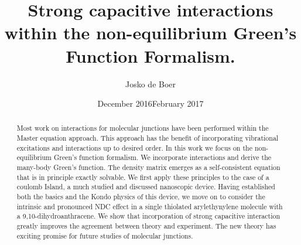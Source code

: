 \documentclass{article}
\title{Strong capacitive interactions within the non-equilibrium Green's Function Formalism.}
\author{Josko de Boer}
\date{December 2016}
\date{February 2017}
\begin{document}
\maketitle
\begin{abstract}
    Most work on interactions for molecular junctions have been performed within the Master equation approach. This approach has the benefit of incorporating vibrational excitations and interactions up to desired order. In this work we focus on the non-equilibrium Green's function formalism. We incorporate interactions and derive the many-body Green's function. The density matrix emerges as a self-consistent equation that is in principle exactly solvable. We first apply these principles to the case of a coulomb Island, a much studied and discussed nanoscopic device.  Having established both the basics {\color{red}and the Kondo physics of this device}, we move on to consider the intrinsic and pronounced NDC effect in a single thiolated arylethynylene molecule with a 9,10-dihydroanthracene. We show that incorporation of strong capacitive interaction greatly improves the agreement between theory and experiment. The new theory has exciting promise for future studies of molecular junctions.
\end{abstract}
\end{document}
